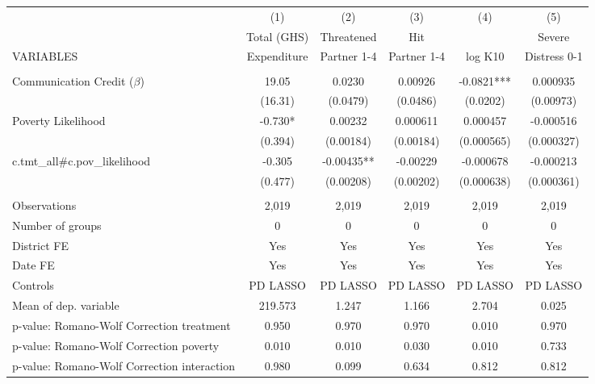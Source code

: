 \begin{tabular}{lccccc} \hline
 & (1) & (2) & (3) & (4) & (5) \\
 & Total (GHS) & Threatened & Hit &  & Severe \\
VARIABLES & Expenditure & Partner 1-4 & Partner 1-4 & log K10 & Distress 0-1 \\ \hline
 &  &  &  &  &  \\
Communication Credit ($\beta$) & 19.05 & 0.0230 & 0.00926 & -0.0821*** & 0.000935 \\
 & (16.31) & (0.0479) & (0.0486) & (0.0202) & (0.00973) \\
Poverty Likelihood & -0.730* & 0.00232 & 0.000611 & 0.000457 & -0.000516 \\
 & (0.394) & (0.00184) & (0.00184) & (0.000565) & (0.000327) \\
c.tmt\_all\#c.pov\_likelihood & -0.305 & -0.00435** & -0.00229 & -0.000678 & -0.000213 \\
 & (0.477) & (0.00208) & (0.00202) & (0.000638) & (0.000361) \\
 &  &  &  &  &  \\
Observations & 2,019 & 2,019 & 2,019 & 2,019 & 2,019 \\
Number of groups & 0 & 0 & 0 & 0 & 0 \\
District FE & Yes & Yes & Yes & Yes & Yes \\
Date FE & Yes & Yes & Yes & Yes & Yes \\
Controls & PD LASSO & PD LASSO & PD LASSO & PD LASSO & PD LASSO \\
Mean of dep. variable & 219.573 & 1.247 & 1.166 & 2.704 & 0.025 \\
p-value: Romano-Wolf Correction treatment & 0.950 & 0.970 & 0.970 & 0.010 & 0.970 \\
p-value: Romano-Wolf Correction poverty & 0.010 & 0.010 & 0.030 & 0.010 & 0.733 \\
 p-value: Romano-Wolf Correction interaction & 0.980 & 0.099 & 0.634 & 0.812 & 0.812 \\ \hline
\end{tabular}
